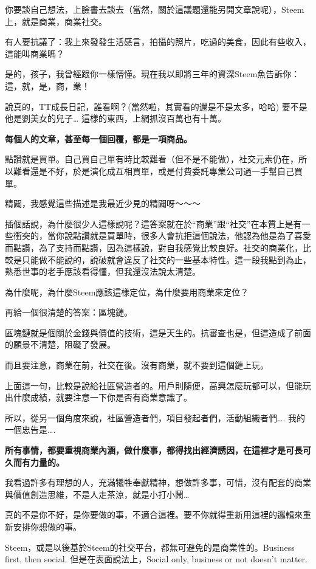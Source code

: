 \documentclass[]{ctexbook}
\begin{document}
你要談自己想法，上臉書去談去（當然，關於這議題還能另開文章說呢），Steem上，就是商業，商業社交。

有人要抗議了：我上來發發生活感言，拍攝的照片，吃過的美食，因此有些收入，這能叫商業嗎？

是的，孩子，我曾經跟你一樣懵懂。現在我以即將三年的資深Steem魚告訴你：這，就，是，商，業！

說真的，TT成長日記，誰看啊？(當然啦，其實看的還是不是太多，哈哈) 要不是他是劉美女的兒子\ldots{} 這樣的東西，上網抓沒百萬也有十萬。

\textbf{每個人的文章，甚至每一個回覆，都是一項商品。}

點讚就是買單。自己買自己單有時比較難看（但不是不能做），社交元素仍在，所以難看還是不好，於是演化成互相買單，或是付費委託專業公司過一手幫自己買單。

精闢，我感覺這些描述是我最近少見的精闢呀～～～

插個話說，為什麼很少人這樣說呢？這答案就在於``商業''跟``社交''在本質上是有一些衝突的，當你說點讚就是買單時，很多人會抗拒這個說法，他認為他是為了喜愛而點讚，為了支持而點讚，因為這樣說，對自我感覺比較良好。社交的商業化，比較是只能做不能說的，說破就會違反了社交的一些基本特性。這一段我點到為止，熟悉世事的老手應該看得懂，但我還沒法說太清楚。

為什麼呢，為什麼Steem應該這樣定位，為什麼要用商業來定位？

再給一個很清楚的答案：區塊鏈。

區塊鏈就是個關於金錢與價值的技術，這是天生的。抗審查也是，但這造成了前面的願景不清楚，阻礙了發展。

而且要注意，商業在前，社交在後。沒有商業，就不要到這個鏈上玩。

上面這一句，比較是說給社區營造者的。用戶則隨便，高興怎麼玩都可以，但能玩出什麼成績，就要注意一下你是否有商業意識了。

所以，從另一個角度來說，社區營造者們，項目發起者們，活動組織者們\ldots{}. 我的一個忠告是\ldots{}.

\textbf{所有事情，都要重視商業內涵，做什麼事，都得找出經濟誘因，在這裡才是可長可久而有力量的。}

我看過許多有理想的人，充滿犧牲奉獻精神，想做許多事，可惜，沒有配套的商業與價值創造思維，不是人走茶涼，就是小打小鬧\ldots{}

真的不是你不好，是你要做的事，不適合這裡。要不你就得重新用這裡的邏輯來重新安排你想做的事。

Steem，或是以後基於Steem的社交平台，都無可避免的是商業性的。Business first, then social. 但是在表面說法上，Social only, business or not doesn't matter.
\end{document}
